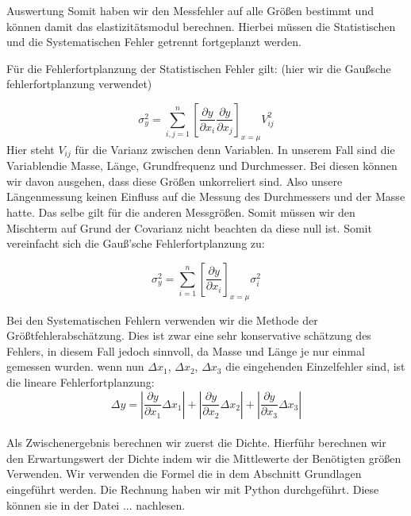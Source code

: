 \documentclass[twoside]{protokoll}
\begin{document}
\begin{aufgabe}{Auswertung}
Somit haben wir den Messfehler auf alle Größen bestimmt und können damit das elastizitätsmodul berechnen. Hierbei müssen die Statistischen und die Systematischen Fehler getrennt fortgeplanzt werden.

Für die Fehlerfortplanzung der Statistischen Fehler gilt: (hier wir die Gaußsche fehlerfortplanzung verwendet) 

\begin{equation}
	\sigma_y^2 = \sum_{i,j=1}^n\left[\frac{\partial y}{\partial x_i}\frac{\partial y}{\partial x_j}\right]_{x=\mu}V_{ij}^2
\end{equation}
Hier steht $V_{ij}$ für die Varianz zwischen denn Variablen. In unserem Fall sind die Variablendie Masse, Länge, Grundfrequenz und Durchmesser. 
Bei diesen können wir davon ausgehen, dass diese Größen unkorreliert sind. 
Also unsere Längenmessung keinen Einfluss auf die Messung des Durchmessers und der Masse hatte.
Das selbe gilt für die anderen Messgrößen. 
Somit müssen wir den Mischterm auf Grund der Covarianz nicht beachten da diese null ist.
Somit vereinfacht sich die Gauß'sche Fehlerfortplanzung zu:

\begin{equation}
	\sigma_y^2 = \sum_{i=1}^n\left[\frac{\partial y}{\partial x_i}\right]_{x=\mu}\sigma_{i}^2
\end{equation}

Bei den Systematischen Fehlern verwenden wir die Methode der Größtfehlerabschätzung. 
Dies ist zwar eine sehr konservative schätzung des Fehlers, in diesem Fall jedoch sinnvoll,
da Masse und Länge je nur einmal gemessen wurden. wenn nun $\Delta x_1$, $\Delta x_2$, $\Delta x_3$
die eingehenden Einzelfehler sind, ist die lineare Fehlerfortplanzung: \\

\begin{equation}
	\Delta y = \left|\frac{\partial y}{\partial x_1}\Delta x_1\right| + 
	\left|\frac{\partial y}{\partial x_2}\Delta x_2\right| + 
	\left|\frac{\partial y}{\partial x_3}\Delta x_3\right|
\end{equation}\\


Als Zwischenergebnis berechnen wir zuerst die Dichte. Hierführ berechnen wir den
Erwartungswert der Dichte indem wir die Mittlewerte der Benötigten größen Verwenden. 
Wir verwenden die Formel die in dem Abschnitt Grundlagen eingeführt werden. Die Rechnung haben wir mit Python durchgeführt. Diese können sie in der Datei ... nachlesen.\\


\end{aufgabe}
\end{document}
